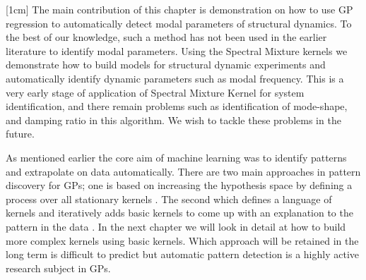 [1cm]
The main contribution of this chapter is demonstration on how to use GP regression to automatically detect modal parameters of structural dynamics. To the best of our knowledge, such a method has not been used in the earlier literature to identify modal parameters. Using the Spectral Mixture kernels we demonstrate how to build models for structural dynamic experiments and automatically identify dynamic parameters such as modal frequency. This is a very early stage of application of Spectral Mixture Kernel for system identification, and there remain problems such as identification of mode-shape, and damping ratio in this algorithm. We wish to tackle these problems in the future. 

As mentioned earlier the core aim of machine learning was to identify patterns and extrapolate on data automatically. There are two main approaches in pattern discovery for GPs; one is based on increasing the hypothesis space by defining a process over all stationary kernels \cite{wilson2012process}. The second which defines a language of kernels and iteratively adds basic kernels to come up with an explanation to the pattern in the data \cite{lloyd2014automatic}. In the next chapter we will look in detail at how to build more complex kernels using basic kernels. Which approach will be retained in the long term is difficult to predict but automatic pattern detection is a highly active research subject in GPs. 


